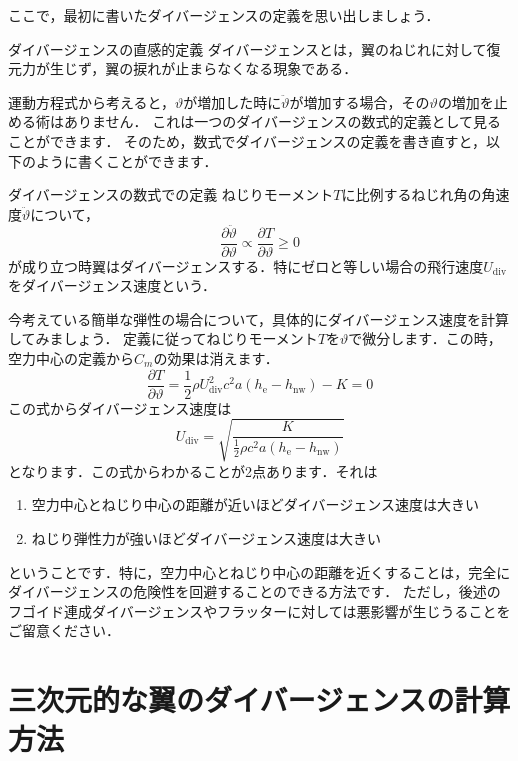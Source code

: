 \documentclass{jarticle}
\begin{document}
ここで，最初に書いたダイバージェンスの定義を思い出しましょう．
\begin{itembox}[l]{ダイバージェンスの直感的定義}
    ダイバージェンスとは，翼のねじれに対して復元力が生じず，翼の捩れが止まらなくなる現象である．
\end{itembox}
運動方程式から考えると，$\vartheta$が増加した時に$\ddot{\vartheta}$が増加する場合，その$\vartheta$の増加を止める術はありません．
これは一つのダイバージェンスの数式的定義として見ることができます．
そのため，数式でダイバージェンスの定義を書き直すと，以下のように書くことができます．
\begin{itembox}[l]{ダイバージェンスの数式での定義}
    ねじりモーメント$T$に比例するねじれ角の角速度$\ddot{\vartheta}$について，
    \begin{equation*}
        \frac{\partial \ddot{\vartheta}}{\partial \vartheta} \propto \frac{\partial T}{\partial \vartheta} \geq 0
    \end{equation*}
    が成り立つ時翼はダイバージェンスする．特にゼロと等しい場合の飛行速度$U_\mathrm{div}$をダイバージェンス速度という．
\end{itembox}

今考えている簡単な弾性の場合について，具体的にダイバージェンス速度を計算してみましょう．
定義に従ってねじりモーメント$T$を$\vartheta$で微分します．この時，空力中心の定義から$C_m$の効果は消えます．
\begin{equation}\label{Tv}
    \frac{\partial T}{\partial \vartheta} = \frac{1}{2}\rho U_\mathrm{div}^2 c^2 a  (h_\mathrm{e}-h_\mathrm{nw}) - K = 0
\end{equation}
この式からダイバージェンス速度は
\begin{equation}
    U_\mathrm{div} = \sqrt{\frac{K}{\frac{1}{2}\rho c^2 a  (h_\mathrm{e}-h_\mathrm{nw})}}
\end{equation}
となります．この式からわかることが2点あります．それは
\begin{enumerate}
    \item 空力中心とねじり中心の距離が近いほどダイバージェンス速度は大きい
    \item ねじり弾性力が強いほどダイバージェンス速度は大きい
\end{enumerate}
ということです．特に，空力中心とねじり中心の距離を近くすることは，完全にダイバージェンスの危険性を回避することのできる方法です．
ただし，後述のフゴイド連成ダイバージェンスやフラッターに対しては悪影響が生じうることをご留意ください．

\section{三次元的な翼のダイバージェンスの計算方法}
\end{document}
